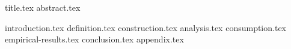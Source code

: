 \documentclass[11pt]{llncs}
\begin{document}
{title.tex}
\thispagestyle{plain}
{abstract.tex}

{introduction.tex}
{definition.tex}
{construction.tex}
{analysis.tex}
{consumption.tex}
{empirical-results.tex}
{conclusion.tex}
\appendix
{appendix.tex}



\end{document}
